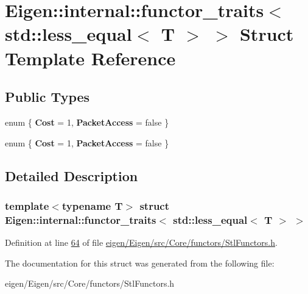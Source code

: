\hypertarget{struct_eigen_1_1internal_1_1functor__traits_3_01std_1_1less__equal_3_01_t_01_4_01_4}{}\section{Eigen\+:\+:internal\+:\+:functor\+\_\+traits$<$ std\+:\+:less\+\_\+equal$<$ T $>$ $>$ Struct Template Reference}
\label{struct_eigen_1_1internal_1_1functor__traits_3_01std_1_1less__equal_3_01_t_01_4_01_4}
\subsection*{Public Types}
\begin{DoxyCompactItemize}
\item 
\mbox{\label{struct_eigen_1_1internal_1_1functor__traits_3_01std_1_1less__equal_3_01_t_01_4_01_4_ae31a5a6f9f500d3b9f31758a9ecdf751}} 
enum \{ {\bfseries Cost} = 1, 
{\bfseries Packet\+Access} = false
 \}
\item 
\mbox{\label{struct_eigen_1_1internal_1_1functor__traits_3_01std_1_1less__equal_3_01_t_01_4_01_4_ac88ed40706ff61ceb81e10fbe81befe5}} 
enum \{ {\bfseries Cost} = 1, 
{\bfseries Packet\+Access} = false
 \}
\end{DoxyCompactItemize}


\subsection{Detailed Description}
\subsubsection*{template$<$typename T$>$\newline
struct Eigen\+::internal\+::functor\+\_\+traits$<$ std\+::less\+\_\+equal$<$ T $>$ $>$}



Definition at line \hyperlink{eigen_2_eigen_2src_2_core_2functors_2_stl_functors_8h_source_l00064}{64} of file \hyperlink{eigen_2_eigen_2src_2_core_2functors_2_stl_functors_8h_source}{eigen/\+Eigen/src/\+Core/functors/\+Stl\+Functors.\+h}.



The documentation for this struct was generated from the following file\+:\begin{DoxyCompactItemize}
\item 
eigen/\+Eigen/src/\+Core/functors/\+Stl\+Functors.\+h\end{DoxyCompactItemize}
